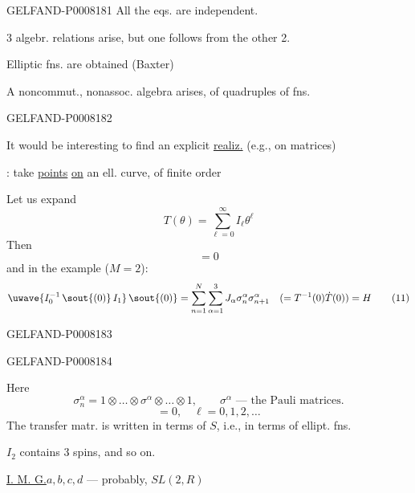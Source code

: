 \begin{GelfandAdjacentEvidence}{GELFAND-P000818}{1}
All the eqs. are independent.

3 algebr. relations arise, but one follows from the other 2.

Elliptic fns. are obtained (Baxter)

A noncommut., nonassoc. algebra arises, of quadruples of fns.
\end{GelfandAdjacentEvidence}
\begin{GelfandAdjacentEvidence}{GELFAND-P000818}{2}


It would be interesting to find an explicit \uline{realiz.} (e.g., on matrices)

: take \uline{points} \uline{on} an ell. curve, of finite order

Let us expand
\begin{equation*}
T(\theta)=\sum_{\ell=0}^{\infty}I_{\ell}\theta^{\ell}\tag{9}
\end{equation*}
Then
\begin{equation*}
[I_n,I_m]=0\tag{10}
\end{equation*}
and in the example (\(M=2\)):
\begin{equation*}
\text{\uwave{\mbox{\(\displaystyle I_0^{-1}\,\text{\sout{(0)}}\,I_1\)}}}\,
\text{\sout{(0)}}
=\sum_{n=1}^{N}\sum_{\alpha=1}^{3}J_\alpha\sigma_n^\alpha\sigma_{n+1}^\alpha
\quad(=T^{-1}(0)\dot T(0))=H\tag{11}
\end{equation*}
\end{GelfandAdjacentEvidence}
\begin{GelfandAdjacentEvidence}{GELFAND-P000818}{3}


\end{GelfandAdjacentEvidence}
\begin{GelfandAdjacentEvidence}{GELFAND-P000818}{4}


Here
\[
\sigma_n^\alpha=1\otimes\ldots\otimes\sigma^\alpha\otimes\ldots\otimes1,
\qquad\sigma^\alpha\text{ — the Pauli matrices.}
\]
\begin{equation*}
[I_\ell,H]=0,\quad\ell=0,1,2,\ldots\tag{12}
\end{equation*}
The transfer matr. is written in terms of \(S\), i.e., in terms of ellipt. fns.

\(I_2\) contains 3 spins, and so on.

\uline{I. M. G.}\quad \(a,b,c,d\) — probably, \(SL(2,R)\)
\end{GelfandAdjacentEvidence}
